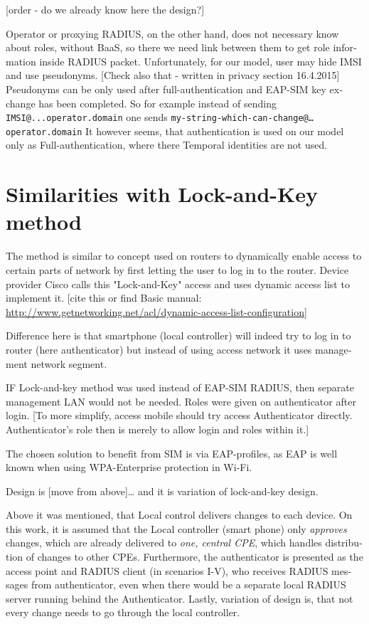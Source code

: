 \documentclass[12pt,a4paper,english]{tutthesis}
\begin{document}
\begin{otherlanguage}{english}
[order - do we already know here the design?]

Operator or proxying RADIUS, on the other hand, does not necessary
know about roles, without BaaS, so there we need link between them to
get role information inside RADIUS packet.
Unfortunately, for our model, user may  hide IMSI and use
pseudonyms. [Check also that - written in privacy section 16.4.2015]
Pseudonyms can be only used after full-authentication and
EAP-SIM key exchange has been completed. 
So for example instead of sending 
\texttt{IMSI@...operator.domain}
one sends  \texttt{my-string-which-can-change@…operator.domain}
 It however seems, that authentication is used on our model only as
Full-authentication, where there Temporal identities are not used.

\section{Similarities with Lock-and-Key method}
\label{sec-4-8}
The method is similar to concept used on routers to dynamically enable
access to certain parts of network by first letting the user to log in
to the router.  
Device provider Cisco calls this "Lock-and-Key" access
and uses dynamic access list to implement it.
[cite this or find Basic manual: \url{http://www.getnetworking.net/acl/dynamic-access-list-configuration}]

Difference here is that smartphone (local controller) will indeed try
to log in to router (here authenticator) but instead of using access network it uses 
management  network segment.


IF Lock-and-key method was used instead of EAP-SIM RADIUS, then
separate management LAN would not be needed. Roles were given on
authenticator after login.  [To more simplify, access mobile should
try access Authenticator directly. Authenticator's role then is merely
to allow login and roles within it.]



The chosen solution to benefit from SIM is via EAP-profiles, as EAP
is well known when using WPA-Enterprise protection in Wi-Fi.

Design is [move from above]\ldots{}
and it is variation of lock-and-key design.

Above it was mentioned, that Local control delivers changes to each
device. On this work, it is assumed that the Local controller (smart
phone) only \emph{approves} changes, which are already delivered to \emph{one,
central CPE}, which handles distribution of changes to other CPEs.
Furthermore, the authenticator is presented as the access point and
RADIUS client (in scenarios I-V), who receives RADIUS messages from
authenticator, even when there would be a separate local RADIUS server
running behind the Authenticator. 
Lastly, variation of design is, that not every change needs to go
 through  the local controller.





\end{otherlanguage}
\end{document}
